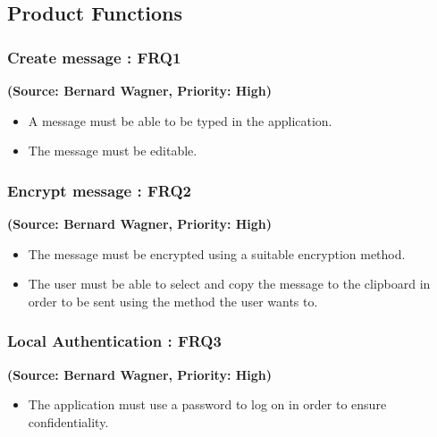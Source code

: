 \subsection{Product Functions}

\normalsize
\vspace{12pt}


\subsubsection{Create message : FRQ1}%
\textbf{(Source: Bernard Wagner, Priority: High)}
\begin{itemize}
\item A message must be able to be typed in the application.
\item The message must be editable.
\end{itemize}

\subsubsection{Encrypt message : FRQ2}
\textbf{(Source: Bernard Wagner, Priority: High)}
\begin{itemize}
\item The message must be encrypted using a suitable encryption method.
\item The user must be able to select and copy the message to the clipboard in order to be sent using the method the user wants to.
\end{itemize}




\subsubsection{Local Authentication : FRQ3}%
\textbf{(Source: Bernard Wagner, Priority: High)}
\begin{itemize}
\item The application must use a password to log on in order to ensure confidentiality.
\end{itemize}


